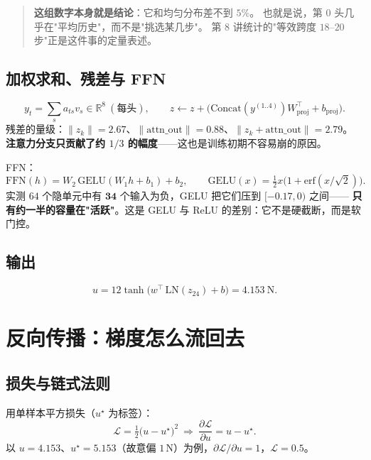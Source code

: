 \begin{quote}
\textbf{这组数字本身就是结论}：它和均匀分布差不到 $5\%$。
也就是说，第 0 头几乎在"平均历史"，而不是"挑选某几步"。
第 8 讲统计的"等效跨度 $18$--$20$ 步"正是这件事的定量表述。
\end{quote}

\subsection{加权求和、残差与 FFN}

\begin{equation}
  y_t=\sum_s a_{ts}v_s\in\mathbb{R}^{8}\ (\text{每头}),
  \qquad
  z\leftarrow z+\big(\text{Concat}(y^{(1..4)})W_{\text{proj}}^\top+b_{\text{proj}}\big).
\end{equation}
残差的量级：$\|z_k\|=2.67$、$\|\text{attn\_out}\|=0.88$、$\|z_k+\text{attn\_out}\|=2.79$。
\textbf{注意力分支只贡献了约 $1/3$ 的幅度}——这也是训练初期不容易崩的原因。

FFN：
\begin{equation}
  \text{FFN}(h)=W_2\,\mathrm{GELU}(W_1h+b_1)+b_2,
  \qquad
  \mathrm{GELU}(x)=\tfrac12x\big(1+\mathrm{erf}(x/\sqrt2)\big).
\end{equation}
实测 $64$ 个隐单元中有 $\mathbf{34}$ 个输入为负，GELU 把它们压到 $[-0.17,0)$ 之间——
\textbf{只有约一半的容量在"活跃"}。这是 GELU 与 ReLU 的差别：它不是硬截断，而是软门控。

\subsection{输出}

\begin{equation}
  u=12\tanh\!\big(w^\top\,\mathrm{LN}(z_{24})+b\big)=4.153\ \mathrm{N}.
\end{equation}

\section{反向传播：梯度怎么流回去}

\subsection{损失与链式法则}

用单样本平方损失（$u^\star$ 为标签）：
\begin{equation}
  \mathcal{L}=\tfrac12\big(u-u^\star\big)^2\ \Rightarrow\
  \frac{\partial\mathcal{L}}{\partial u}=u-u^\star .
\end{equation}
以 $u=4.153$、$u^\star=5.153$（故意偏 $1$\,N）为例，$\partial\mathcal{L}/\partial u=1$，$\mathcal{L}=0.5$。

